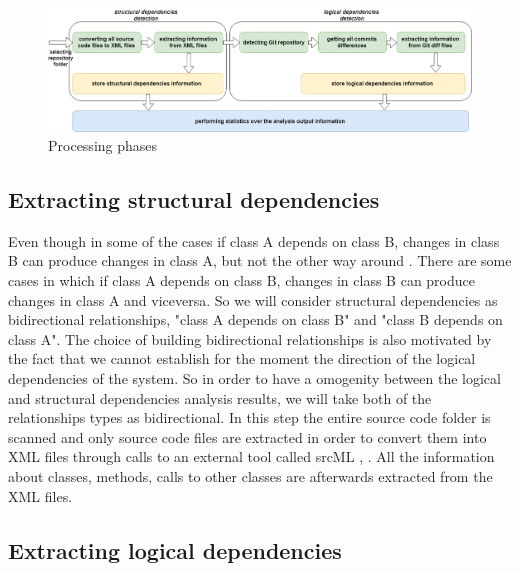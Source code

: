 \documentclass[conference]{IEEEtran}
\begin{document}
\begin{figure}[htb]
\centering
\includegraphics[width=\textwidth]{fig3.png}
\caption{Processing phases}
\label{fig:fig3}
\end{figure}

\subsection{ Extracting structural dependencies}

Even though in some of the cases if class A depends on class B, changes in class B can produce changes in class A, but not the other way around \cite{Yu2007} . There are some cases in which if class A depends on class B,  changes in class B can produce changes in class A and viceversa. So we will consider structural dependencies as bidirectional relationships, "class A depends on class B" and "class B depends on class A". The choice of building bidirectional relationships is also motivated by the fact that we cannot establish for the moment the direction of the logical dependencies of the system. So in order to have a omogenity between the logical and structural dependencies analysis results, we will take both of the relationships types as bidirectional.
In this step the entire source code folder is scanned and only source code files are extracted in order to convert them into XML files through calls to an external tool called srcML \cite{2003:XLC:851042.857028},
\cite{Collard:2011:LTF:2067850.2068011}. All the information about classes, methods, calls to other classes are afterwards extracted from the XML files.

\subsection{Extracting logical dependencies}
\end{document}
